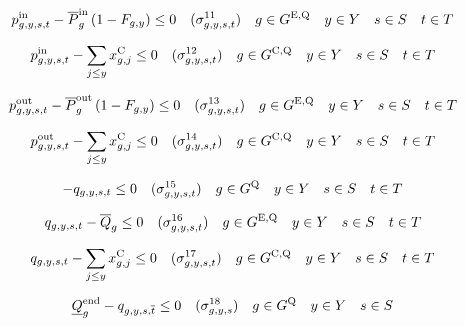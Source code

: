 \documentclass{article}
\newcommand{\sScenarioSets}{\quad  \iYear \in \sYears \quad  \iScenario \in \sScenarios \quad  \iInterval \in \sIntervals}
\begin{document}
\begin{equation}
	\vPowerIn - \cPowerChargingMax \left(1 - \cRetirementIndicator\right) \leq 0 \quad (\dMaxChargingRateExisting) \quad  \iGenerator \in \sStorageExisting \sScenarioSets
\end{equation}

\begin{equation}
	\vPowerIn - \sum\limits_{\iYearAlias \leq \iYear} \vInstalledCapacity[\iGenerator,\iYearAlias] \leq 0 \quad (\dMaxChargingRateCandidate) \quad  \iGenerator \in \sStorageCandidate \sScenarioSets
\end{equation}

\begin{equation}
	\vPowerOut - \cPowerDischargingMax \left(1 - \cRetirementIndicator\right) \leq 0 \quad (\dMaxDischargingRateExisting) \quad  \iGenerator \in \sStorageExisting \sScenarioSets
\end{equation}

\begin{equation}
	\vPowerOut - \sum\limits_{\iYearAlias \leq \iYear} \vInstalledCapacity[\iGenerator,\iYearAlias] \leq 0 \quad (\dMaxDischargingRateCandidate) \quad  \iGenerator \in \sStorageCandidate \sScenarioSets
\end{equation}

\begin{equation}
	- \vStorageUnitEnergy \leq 0 \quad (\dNonNegativeStorageEnergy) \quad  \iGenerator \in \sStorage \sScenarioSets
\end{equation}

\begin{equation}
	\vStorageUnitEnergy - \cStorageUnitEnergyMax \leq 0 \quad (\dMaxStorageEnergyExisting) \quad  \iGenerator \in \sStorageExisting \sScenarioSets
\end{equation}

\begin{equation}
	\vStorageUnitEnergy - \sum\limits_{\iYearAlias \leq \iYear} \vInstalledCapacity[\iGenerator,\iYearAlias] \leq 0 \quad (\dMaxStorageEnergyCandidate) \quad  \iGenerator \in \sStorageCandidate \sScenarioSets
\end{equation}

\begin{equation}
	\cStorageUnitEnergyIntervalEndMin - \vStorageUnitEnergy[\iGenerator,\iYear,\iScenario,\iIntervalTerminal]\leq  0 \quad (\dMinStorageEnergyIntervalEnd) \quad  \iGenerator \in \sStorage \quad  \iYear \in \sYears \quad  \iScenario \in \sScenarios
\end{equation}
\end{document}
